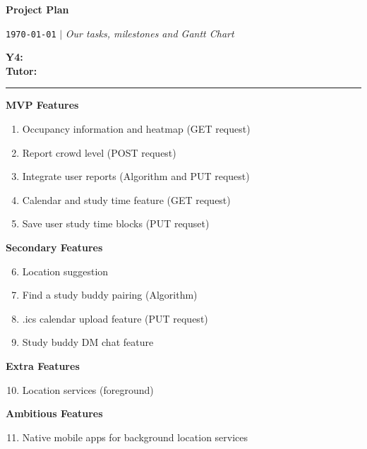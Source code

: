\documentclass{article}
\begin{document}
\begin{Large}
    \textbf{Project Plan} \\
\end{Large}

\begin{large}
    \texttt{\today} $\vert$ \textit{Our tasks, milestones and Gantt Chart} \\
\end{large}



\textsf{\textbf{Y4:}} \\
\textsf{\textbf{Tutor:}} 


\vspace{1em}
\hrule
\vspace{1.5em}

\textbf{MVP Features}

\begin{enumerate}
    \item Occupancy information and heatmap (GET request)
    \item Report crowd level (POST request)
    \item Integrate user reports (Algorithm and PUT request)
    \item Calendar and study time feature (GET request)
    \item Save user study time blocks (PUT requset)
\end{enumerate}

\textbf{Secondary Features}

\begin{enumerate}
    \setcounter{enumi}{5}
    \item Location suggestion
    \item Find a study buddy pairing (Algorithm)
    \item .ics calendar upload feature (PUT request)
    \item Study buddy DM chat feature
\end{enumerate}

\textbf{Extra Features}
\begin{enumerate}
    \setcounter{enumi}{9}
    \item Location services (foreground)
\end{enumerate}

\textbf{Ambitious Features}
\begin{enumerate}
    \setcounter{enumi}{10}
    \item Native mobile apps for background location services
\end{enumerate}
\end{document}
